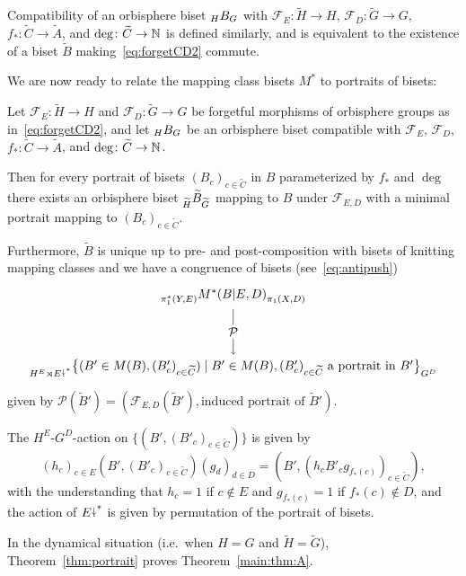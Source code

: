 \documentclass{amsart}
\newcommand\Forget{{\mathcal F}}
\newcommand\wtA{{\widetilde A}}
\newcommand\wtB{{\widetilde B}}
\newcommand\wtC{{\widetilde C}}
\newcommand\wtG{{\widetilde G}}
\newcommand\wtH{{\widetilde H}}
\begin{document}
Compatibility of an orbisphere biset $\subscript H B_G$ with
$\Forget_E\colon\wtH\to H$, $\Forget_D\colon\wtG\to G$,
$f_*\colon \wtC\to\wtA$, and $\deg\colon \wtC\to\N$ is defined
similarly, and is equivalent to the existence of a biset $\wtB$
making~\eqref{eq:forgetCD2} commute.

We are now ready to relate the mapping class bisets $M^*$ to portraits
of bisets:
\begin{thm}\label{thm:portrait}
  Let $\Forget_E\colon\wtH\to H$ and
  $\Forget_D\colon\wtG\to G$ be forgetful morphisms of
  orbisphere groups as in~\eqref{eq:forgetCD2}, and let
  $\subscript H B_G$ be an orbisphere biset compatible with $\Forget_E$, $\Forget_D$, $f_*\colon \wtC\to\wtA$, and $\deg\colon \wtC\to\N$.

  Then for every portrait of bisets $(B_c)_{c\in \wtC}$ in $B$
  parameterized by $f_*$ and $\deg$ there exists an orbisphere biset
  $\subscript{\wtH}{\wtB}_{\wtG}$ mapping to $B$ under $\Forget_{E,D}$
  with a minimal portrait mapping to $(B_c)_{c\in \wtC}$.

  Furthermore, $\wtB$ is unique up to pre- and
  post-composition with bisets of knitting mapping classes and we have
  a congruence of bisets (see~\eqref{eq:antipush})
  \begin{equation}\label{eq:thm:portrait:congr}
    \begin{tikzpicture}[description/.style={fill=white,inner sep=2pt},baseline]
      \node(A) at (0,0){$\subscript{\pi_1^*(Y,E)}{M^*(B|E,D)}_{\pi_1(X,D)}$};
      \node(B) at(0,-2){$\subscript{H^E\rtimes E\perm^*}{\big\{(B'\in M(B),(B'_c)_{c\in\wtC})\mid B'\in M(B),(B'_c)_{c\in\wtC}\text{ a portrait in }B'\big\}}_{G^D}$};
      \draw (A) edge[->]node[description]{$\mathcal P$} (B);
    \end{tikzpicture}
  \end{equation}
  given by
  $\mathcal P(\wtB')=(\Forget_{E,D}(\wtB'),\text{induced portrait of }\wtB')$.
 \end{thm}
 \noindent The $H^E$-$G^D$-action on $\{(B',(B'_c)_{c\in\wtC})\}$ is
 given by
\[(h_c)_{c\in E}(B',(B'_c)_{c\in \wtC})(g_d)_{d\in D}=(B',(h_c
  B'_c g_{f_*(c)})_{c\in \wtC}),
\]
with the understanding that $h_c=1$ if $c\not\in E$ and $g_{f_*(c)}=1$
if $f_*(c)\not\in D$, and the action of $E{\stackrel{\downarrow}{\smash.}}^*$ is given by
permutation of the portrait of bisets.

In the dynamical situation (i.e.~when $H=G$ and
$\wtH=\wtG$), Theorem~\ref{thm:portrait} proves
Theorem~\ref{main:thm:A}.
\end{document}
